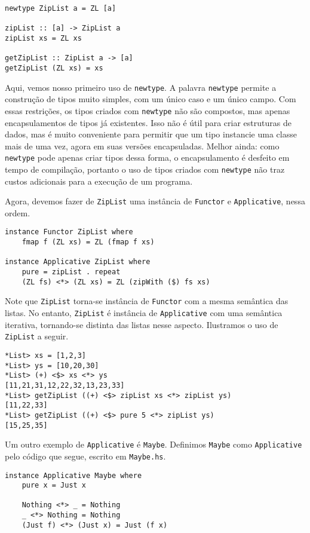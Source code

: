 \documentclass[a4paper]{article}
\begin{document}
\begin{verbatim}
newtype ZipList a = ZL [a]

zipList :: [a] -> ZipList a
zipList xs = ZL xs

getZipList :: ZipList a -> [a]
getZipList (ZL xs) = xs
\end{verbatim}

Aqui, vemos nosso primeiro uso de \texttt{newtype}.
A palavra \texttt{newtype} permite a construção de tipos muito simples, com um único caso e um único campo.
Com essas restrições, os tipos criados com \texttt{newtype} não são compostos, mas apenas encapsulamentos de tipos já existentes.
Isso não é útil para criar estruturas de dados, mas é muito conveniente para permitir que um tipo instancie uma classe mais de uma vez, agora em suas versões encapsuladas.
Melhor ainda: como \texttt{newtype} pode apenas criar tipos dessa forma, o encapsulamento é desfeito em tempo de compilação, portanto o uso de tipos criados com \texttt{newtype} não traz custos adicionais para a execução de um programa.

Agora, devemos fazer de \texttt{ZipList} uma instância de \texttt{Functor} e \texttt{Applicative}, nessa ordem.

\begin{verbatim}
instance Functor ZipList where
	fmap f (ZL xs) = ZL (fmap f xs)

instance Applicative ZipList where
	pure = zipList . repeat
	(ZL fs) <*> (ZL xs) = ZL (zipWith ($) fs xs)
\end{verbatim}

Note que \texttt{ZipList} torna-se instância de \texttt{Functor} com a mesma semântica das listas.
No entanto, \texttt{ZipList} é instância de \texttt{Applicative} com uma semântica iterativa, tornando-se distinta das listas nesse aspecto.
Ilustramos o uso de \texttt{ZipList} a seguir.

\begin{verbatim}
*List> xs = [1,2,3]
*List> ys = [10,20,30]
*List> (+) <$> xs <*> ys
[11,21,31,12,22,32,13,23,33]
*List> getZipList ((+) <$> zipList xs <*> zipList ys)
[11,22,33]
*List> getZipList ((+) <$> pure 5 <*> zipList ys)
[15,25,35]
\end{verbatim}

Um outro exemplo de \texttt{Applicative} é \texttt{Maybe}.
Definimos \texttt{Maybe} como \texttt{Applicative} pelo código que segue, escrito em \texttt{Maybe.hs}.

\begin{verbatim}
instance Applicative Maybe where
	pure x = Just x
	
	Nothing <*> _ = Nothing
	_ <*> Nothing = Nothing
	(Just f) <*> (Just x) = Just (f x)
\end{verbatim}
\end{document}
